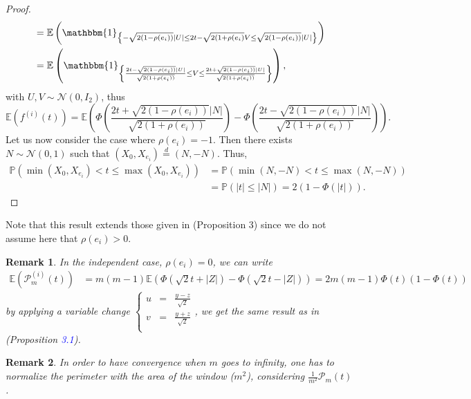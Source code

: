 \documentclass[12pt]{article}
\theoremstyle{Theorem}
\newtheorem{remark}{Remark}
\begin{document}
\begin{proof}
{\begin{align*}
& = \mathbb{E}\left(\mathbbm{1}_{\left\{ - \sqrt{2(1-\rho(e_i))}\left|U\right| \leq 2t - \sqrt{2(1+\rho(e_i)}V \leq \sqrt{2(1-\rho(e_i))}\left|U\right| \right\}}\right) \\
& = \mathbb{E}\left(\mathbbm{1}_{\left\{\frac{2t - \sqrt{2(1-\rho(e_i))}|U|}{\sqrt{2(1+\rho(e_i))}}  \leq V \leq \frac{2t + \sqrt{2(1-\rho(e_i))}|U|}{\sqrt{2(1+\rho(e_i))}}\right\}}\right), 
\end{align*}}  
with $U, V \sim \mathcal{N}(0,I_{2})$, thus 
$$\mathbb{E}\left(f^{(i)}(t)\right) = \mathbb{E}\left(\Phi\left(\dfrac{2t + \sqrt{2(1-\rho(e_i))}|N|}{\sqrt{2(1+\rho(e_i))}}\right)  - \Phi\left(\dfrac{2t - \sqrt{2(1-\rho(e_i))}|N|}{\sqrt{2(1+\rho(e_i))}}\right)\right).$$
Let us now consider the case where $\rho(e_i) = -1$. Then there exists $N \sim \mathcal{N}\left(0,1\right)$ such that $\left(X_{\scriptscriptstyle 0}, X_{e_i}\right) \overset{d}{=} \left(N, -N\right)$. Thus, 
\begin{align*}
\mathbb{P}\left(\min\left(X_{\scriptscriptstyle 0}, X_{e_i}\right) < t \leq \max\left(X_{\scriptscriptstyle 0}, X_{e_i}\right)\right) & = \mathbb{P}\left(\min\left(N, -N\right) < t \leq \max\left(N, -N\right)\right) \\
& = \mathbb{P}\left(|t| \leq |N|\right) = 2\left(1 - \Phi\left(|t|\right)\right).
\end{align*}
\end{proof}
Note that this result extends those given in \cite{HermineAgnes} (Proposition 3) since we do not assume here that $\rho(e_i) > 0$. 
\begin{remark}
\label{iidCase}
In the independent case, $\rho(e_i) = 0$, we can write
{\small
\begin{align*}
\mathbb{E}\left(\mathcal{P}^{\scriptscriptstyle  (i)}_{m}(t) \right) & = m(m-1)\mathbb{E}\left(\Phi\left(\sqrt{2}t + |Z|\right) - \Phi\left(\sqrt{2}t - |Z|\right)\right) = 2m(m-1)\Phi(t)\left(1-\Phi(t)\right) 
\end{align*}}
by applying a variable change {\small$\left\{\begin{array}{rcl}
u & = & \frac{y - z}{\sqrt{2}} \\
v & = & \frac{y+z}{\sqrt{2}} \\
\end{array}\right.$}, we get the same result as in \cite{Psymetrie} (Proposition \textcolor{blue}{3.1}).
\end{remark}
\begin{remark}
In order to have convergence when $m$ goes to infinity, one has to normalize the perimeter with the area of the window ($m^2$), considering $\frac{1}{m^2}\mathcal{P}_{m}(t)$.
\end{remark}
\end{document}
